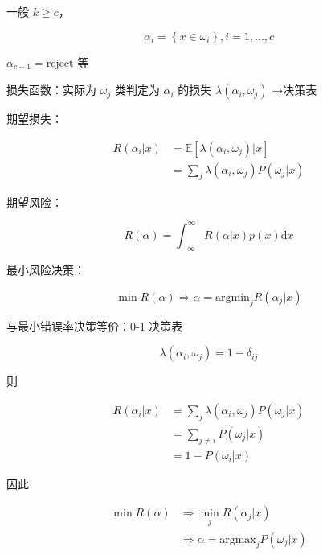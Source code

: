 \documentclass[openany,a4paper,12pt]{ctexbook}
\theoremstyle{kaiti}
\theoremstyle{normal}
\begin{document}
一般 $k\geqslant c$，

\begin{equation}
\alpha_i=\left\{ x\in \omega_i \right\} , i=1,\dots ,c
\end{equation}

$\alpha_{c+1}=\mathrm{reject}$ 等

损失函数：实际为 $\omega_j$ 类判定为 $\alpha_i$ 的损失 $\lambda \left(\alpha_i,\omega_j \right)$ →决策表

期望损失：

\begin{equation}
\begin{aligned}
  R\left(\alpha_i|x \right)
  &=\mathbb{E} \left[\lambda \left(\alpha_i,\omega_j \right)|x \right]\\
  &=\sum_j\lambda \left(\alpha_i,\omega_j \right)P\left(\omega_j|x \right)
\end{aligned}
\end{equation}

期望风险：

\begin{equation}
R\left(\alpha \right)=\int_{-\infty}^{\infty}{R\left(\alpha |x \right)p(x)}\mathrm{d}x
\end{equation}

最小风险决策：

\begin{equation}
\min R\left(\alpha \right)\Rightarrow \alpha =\mathrm{argmin}_jR\left(\alpha_j|x \right)
\end{equation}

与最小错误率决策等价：0-1 决策表

\begin{equation}
\lambda \left(\alpha_i,\omega_j \right)=1-\delta_{ij}
\end{equation}

则

\begin{equation}
\begin{aligned}
  R\left(\alpha_i|x \right)
  &=\sum_j\lambda \left(\alpha_i,\omega_j \right)P\left(\omega_j|x \right)\\
  &=\sum_{j\ne i}P\left(\omega_j|x \right)\\
  &=1-P\left(\omega_i|x \right)
\end{aligned}
\end{equation}

因此

\begin{equation}
\begin{aligned}
  \min R\left(\alpha \right)
  &\Rightarrow \min_jR\left(\alpha_j|x \right)\\
  &\Rightarrow \alpha =\mathrm{argmax}_jP\left(\omega_j|x \right)
\end{aligned}
\end{equation}
\end{document}
